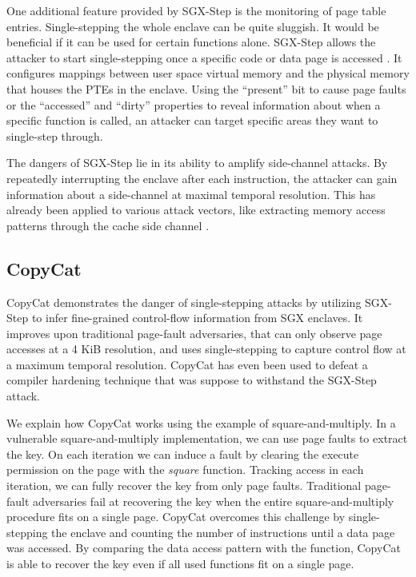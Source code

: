 \documentclass{llncs}
\begin{document}
One additional feature provided by SGX-Step is the monitoring of page table entries.
Single-stepping the whole enclave can be quite sluggish.
It would be beneficial if it can be used for certain functions alone.
SGX-Step allows the attacker to start single-stepping
once a specific code or data page is accessed \cite{BulckWKPS17}.
It configures mappings between user space virtual memory and
the physical memory that houses the PTEs in the enclave.
Using the ``present'' bit to cause page faults \cite{XuCP15} or
the ``accessed'' and ``dirty'' properties to reveal information about
when a specific function is called,
an attacker can target specific areas they want to single-step through.

The dangers of SGX-Step lie in its ability to amplify side-channel attacks.
By repeatedly interrupting the enclave after each instruction,
the attacker can gain information about a side-channel at maximal temporal resolution.
This has already been applied to various attack vectors,
like extracting memory access patterns through the cache side channel \cite{HahnelCP17}.

\subsection{CopyCat}

CopyCat \cite{MoghimiBHPS20} demonstrates the danger of single-stepping attacks
by utilizing SGX-Step to infer fine-grained control-flow information from SGX enclaves.
It improves upon traditional page-fault adversaries,
that can only observe page accesses at a 4 KiB resolution,
and uses single-stepping to capture control flow at a maximum temporal resolution.
CopyCat has even been used to defeat a compiler hardening technique \cite{HosseinzadehLLP18} that was
suppose to withstand the SGX-Step attack.

We explain how CopyCat works using the example of square-and-multiply.
In a vulnerable square-and-multiply implementation,
we can use page faults to extract the key.
On each iteration we can induce a fault by clearing the execute permission on
the page with the \emph{square} function.
Tracking access in each iteration, we can fully recover the key from only page faults.
Traditional page-fault adversaries fail at recovering the key when the entire
square-and-multiply procedure fits on a single page.
CopyCat overcomes this challenge by single-stepping the enclave and counting the
number of instructions until a data page was accessed.
By comparing the data access pattern with the function, CopyCat is able to recover the key
even if all used functions fit on a single page.
\end{document}
